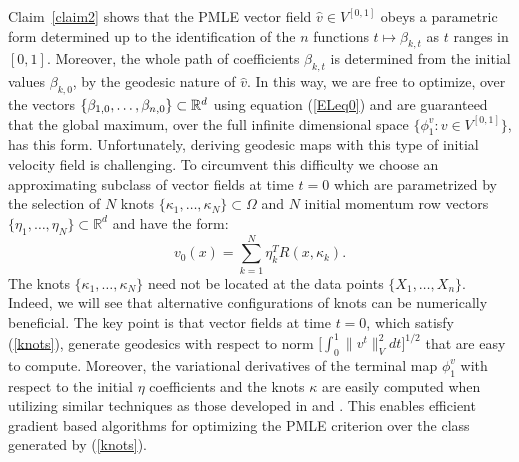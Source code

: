 \documentclass[noinfoline]{imsart}
\begin{document}
Claim~\ref{claim2} shows that the PMLE vector field $\hat{v}\in V^{[0,1]}$ obeys a parametric form determined up to the identification of the $n$ functions $t\mapsto \beta_{k,t}$ as $t$ ranges in $[0,1]$. Moreover, the whole path of coefficients $\beta_{k,t}$ is determined from the initial values $\beta_{k,0}$, by the geodesic nature of $\hat v$. 
In this way, we are free to optimize, over the vectors $\{\beta_{1,0}, \ldots, \beta_{n,0}\}\subset \Bbb R^d$ using equation (\ref{ELeq0}) 
 and are guaranteed that the global maximum, over the full infinite dimensional space $\{ \phi_1^v\colon v\in V^{[0,1]}\}$, has this form.  Unfortunately, deriving geodesic maps with this type of initial velocity field is challenging.  
To circumvent this difficulty we choose an approximating  subclass of vector fields at time $t=0$ which are parametrized by the selection of $N$ knots $\{\kappa_{1},\ldots, \kappa_N\} \subset \Omega$ and $N$ initial momentum row vectors $\{\eta_{1},\ldots, \eta_N\} \subset  \mathbb{R}^d$ and have the form: 
\begin{equation}
\label{knots}
 v_0(x)= \sum_{k=1}^N \eta^T_{k} R(x,\kappa_{k}).
 \end{equation}
The knots $\{ \kappa_1,\ldots, \kappa_N\}$ need not be located at the data points $\{X_1,\ldots, X_n \}$. Indeed, we will see that alternative configurations of knots can be numerically beneficial. The key point is that vector fields at time $t=0$, which satisfy (\ref{knots}), generate geodesics with respect to norm $\bigl[\int_0^1 \| v^t  \|^2_V dt \bigr]^{1/2}$ that are easy to compute. Moreover, the variational derivatives of the terminal map $\phi^v_1$ with respect to the initial $\eta$ coefficients and the knots $\kappa$ are easily computed when utilizing  similar techniques  as those developed in \cite{vaillant:04} and \cite{alla:07}. This enables efficient gradient based algorithms for optimizing the PMLE criterion over the class generated by (\ref{knots}).
\end{document}
